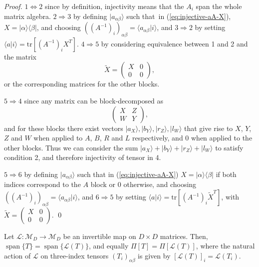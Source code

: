 \documentclass[cmp]{svjour}
\newcommand{\mc}[1]{\mathcal{#1}}
\newcommand{\tr}{\mathrm{tr}}
\DeclareMathOperator{\spann}{span}
\newcommand{\bra}[1]{\langle #1|}
\newcommand{\ket}[1]{|#1\rangle}
\newcommand{\braket}[2]{\langle #1|#2\rangle}
\begin{document}
\begin{proof}
    $1\Leftrightarrow 2$ since by definition, injectivity means that the $A_i$
    span the whole matrix algebra. $2\Rightarrow 3$ by defining
    $\ket{a_{\alpha\beta}}$ such that\ in (\ref{eq:injective-aA-X}),
    $X=\ket{\alpha}\bra{\beta}$, and choosing $((A^{-1})_i)_{\alpha\beta} =
        \braket{a_{\alpha\beta}}{i}$, and $3\Rightarrow 2$ by setting
    $\braket{a}{i}=\tr[(A^{-1})_i X^T]$.
    $4\Rightarrow 5$ by considering equivalence between 1 and 2 and the matrix \[\tilde{X}=\left( \begin{array}{cc}
                X & 0 \\
                0 & 0
            \end{array} \right), \]
    or the corresponding matrices for the other blocks.

    $5\Rightarrow 4$ since any matrix can be block-decomposed as
    \[\left( \begin{array}{cc}
                X & Z \\
                W & Y
            \end{array} \right),\] and for these blocks there exist vectors $\ket{a_X}, \ket{b_Y}, \ket{r_Z}, \ket{l_W}$ that give rise to $X$, $Y$, $Z$ and $W$ when applied to $A$, $B$, $R$ and $L$ respectively, and 0 when applied to the other blocks. Thus we can consider the sum $\ket{a_X}+\ket{b_Y}+\ket{r_Z}+\ket{l_W}$ to satisfy condition 2, and therefore injectivity of tensor in 4.

    $5\Rightarrow 6$ by defining
    $\ket{a_{\alpha\beta}}$ such that in (\ref{eq:injective-aA-X})
    $X=\ket{\alpha}\bra{\beta}$ if both indices correspond to the $A$ block or 0 otherwise, and choosing $((A^{-1})_i)_{\alpha\beta} =
        \braket{a_{\alpha\beta}}{i}$,  and $6\Rightarrow 5$ by setting
    $\braket{a}{i}=\tr[(A^{-1})_i \tilde{X}^T]$, with $\tilde{X}=\left( \begin{array}{cc}
                X & 0 \\
                0 & 0
            \end{array} \right)$.
    \hspace*{\fill}\qed
\end{proof}



\begin{lemma}
    \label{lemma:span-gaugeinvariance}
    Let $\mc L:\mc M_D\rightarrow \mc M_D$ be an invertible map on $D\times D$
    matrices.  Then, $\spann\{T\}=\spann\{\mc L(T)\}$, and equally
    $\Pi[T]=\Pi[\mc L(T)]$, where the natural action of $\mc L$ on three-index tensors $(T_i)_{\alpha\beta}$ is given by
    $[\mc L(T)]_i=\mc L(T_i)$.
\end{lemma}
\end{document}
